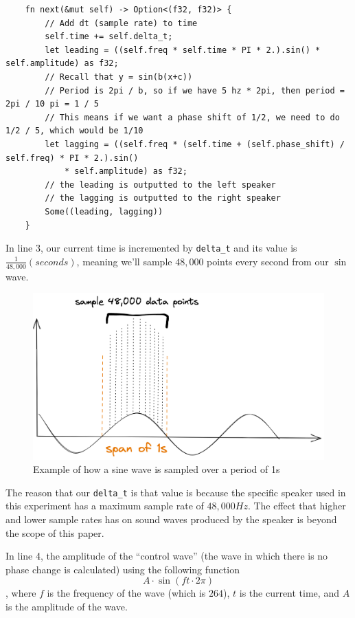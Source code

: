 \documentclass[index]{subfiles}
\begin{document}
\begin{verbatim}
    fn next(&mut self) -> Option<(f32, f32)> {
        // Add dt (sample rate) to time
        self.time += self.delta_t;
        let leading = ((self.freq * self.time * PI * 2.).sin() * self.amplitude) as f32;
        // Recall that y = sin(b(x+c))
        // Period is 2pi / b, so if we have 5 hz * 2pi, then period = 2pi / 10 pi = 1 / 5
        // This means if we want a phase shift of 1/2, we need to do 1/2 / 5, which would be 1/10
        let lagging = ((self.freq * (self.time + (self.phase_shift) / self.freq) * PI * 2.).sin()
            * self.amplitude) as f32;
        // the leading is outputted to the left speaker
        // the lagging is outputted to the right speaker
        Some((leading, lagging))
    }
\end{verbatim}

In line 3, our current time is incremented by \verb+delta_t+ and its value is \(\frac{1}{48,000}(seconds)\), meaning we'll sample \(48,000\) points every second from our \(\sin\) wave.

\begin{figure}[H]
    \centering
    \includegraphics[scale=0.15]{res/sampling.png}
    \caption{Example of how a sine wave is sampled over a period of 1s}
\end{figure}

The reason that our \verb+delta_t+ is that value is because the specific speaker used in this experiment has a maximum sample rate of \(48,000Hz\). The effect that higher and lower sample rates has on sound waves produced by the speaker is beyond the scope of this paper.

In line 4, the amplitude of the ``control wave'' (the wave in which there is no phase change is calculated) using the following function
\begin{equation*}
    A\cdot\sin\left(ft\cdot2\pi\right)
\end{equation*}, where \(f\) is the frequency of the wave (which is \(264\)), \(t\) is the current time, and \(A\) is the amplitude of the wave.
\end{document}
